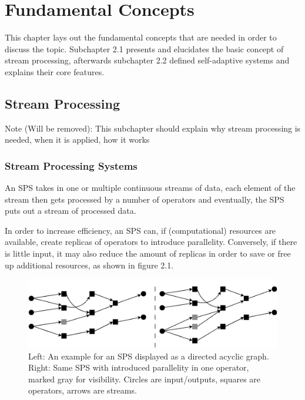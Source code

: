 \chapter{Fundamental Concepts}
This chapter lays out the fundamental concepts that are needed in order to discuss the topic.
Subchapter 2.1 presents and elucidates the basic concept of stream processing, afterwards
subchapter 2.2 defined self-adaptive systems and explains their core features.
    \section{Stream Processing}
    Note (Will be removed): This subchapter should explain why stream processing is needed, when it is applied, how it works
    
        \subsection{Stream Processing Systems}
        An SPS takes in one or multiple continuous streams of data, each element of the stream then gets processed by a number of operators and eventually, 
        the SPS puts out a stream of processed data.
    
        In order to increase efficiency, an SPS can, if (computational) resources are available, create replicas of operators to introduce parallelity. 
        Conversely, if there is little input, it may also reduce the amount of replicas in order to save or free up additional resources, as shown in figure 2.1.
        \begin{figure}[h]
        \centering
        \includegraphics[width=1.0\textwidth]{Bilder/sps_parallel_normal.png}
        \caption{
                Left: An example for an SPS displayed as a directed acyclic graph. 
                Right: Same SPS with introduced parallelity in one operator, marked gray for visibility. 
                Circles are input/outputs, squares are operators, arrows are streams.
                }
        \label{fig:sps_parallel_normal}
        \end{figure}
